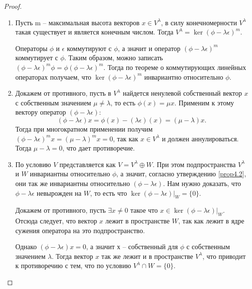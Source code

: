 \begin{proof}~
    \begin{enumerate}
        \item Пусть m -- максимальная высота векторов $x \in V^{\lambda}$, в силу конечномерности 
              $V^{\lambda}$ такая существует и является конечным числом.
              Тогда $V^{\lambda} = \ker (\phi - \lambda \epsilon)^m$. 

              Операторы $\phi$ и $\epsilon$
              коммутируют с $\phi$, а значит и оператор $(\phi - \lambda \epsilon)^m$ коммутирует с 
              $\phi$. Таким образом, можно записать 
              $(\phi - \lambda \epsilon)^m \phi = \phi (\phi - \lambda \epsilon)^m$. 
              Тогда по теореме о коммутирующих линейных операторах получаем, что $\ker (\phi - \lambda \epsilon)^m$ 
              инвариантно относительно $\phi$. 
        \item Докажем от противного, пусть в $V^{\lambda}$ найдется ненулевой собственный вектор $x$ 
              с собственным значением $\mu \neq \lambda$, то есть $\phi(x) = \mu x$. Применим к этому 
              вектору оператор $(\phi - \lambda \epsilon)$:  
              $$(\phi - \lambda \epsilon) x = \phi(x) - (\lambda \epsilon)(x) = (\mu - \lambda) x.$$ 
              Тогда при многократном применении 
              получим $(\phi - \lambda \epsilon)^m x = (\mu - \lambda)^m x = 0$,
              так как $x \in V^{\lambda}$ и должен аннулироваться. Тогда $\mu - \lambda = 0$, 
              что дает противоречие.
        \item По условию $V$ представляется как $V = V^{\lambda} \oplus W$. При этом подпространства 
              $V^{\lambda}$ и $W$ инвариантны относительно $\phi$, а значит, согласно утверждению 
              \ref{prop4.2}, они так же инвариантны относительно $(\phi - \lambda \epsilon)$. 
              Нам нужно доказать, что $\phi - \lambda \epsilon$ невырожден на $W$, то есть что 
              $\ker (\phi - \lambda \epsilon) \vert_{W} = \{0\}$.

              Докажем от противного, пусть $\exists x \neq 0$ такое что 
              $x \in \ker (\phi - \lambda \epsilon) \vert_{W}$. 
              Отсюда следует, что вектор $x$ лежит в пространстве $W$, так как лежит в ядре сужения
              оператора на это подпространство.

              Однако $(\phi - \lambda \epsilon) x = 0$, а значит х -- собственный для $\phi$ 
              с собственным значением $\lambda$. Тогда вектор $x$ так же лежит и в пространстве 
              $V^{\lambda}$, что приводит к 
              противоречию с тем, что по условию $V^{\lambda} \cap W = \{0\}$.
    \end{enumerate}
\end{proof}

